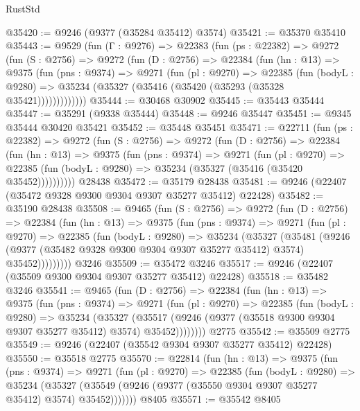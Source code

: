 \begin{lexlean}{RustStd}
\begin{coremodule}
@35420 := @9246 (@9377 (@35284 @35412) @3574)
@35421 := @35370 @35410
@35443 := @9529
    (fun (Γ : @9276) =>
    @22383
      (fun (ps : @22382) =>
      @9272
        (fun (S : @2756) =>
        @9272
          (fun (D : @2756) =>
          @22384
            (fun (hn : @13) =>
            @9375
              (fun (pns : @9374) =>
              @9271
                (fun (pl : @9270) =>
                @22385
                  (fun (bodyL : @9280) =>
                  @35234 (@35327 (@35416 (@35420 (@35293 (@35328 @35421)))))))))))))
@35444 := @30468 @30902
@35445 := @35443 @35444
@35447 := @35291 (@9338 @35444)
@35448 := @9246 @35447
@35451 := @9345 @35444 @30420 @35421
@35452 := @35448 @35451
@35471 := @22711
    (fun (ps : @22382) =>
    @9272
      (fun (S : @2756) =>
      @9272
        (fun (D : @2756) =>
        @22384
          (fun (hn : @13) =>
          @9375
            (fun (pns : @9374) =>
            @9271
              (fun (pl : @9270) =>
              @22385 (fun (bodyL : @9280) => @35234 (@35327 (@35416 (@35420 @35452))))))))))
    @28438
@35472 := @35179 @28438
@35481 := @9246 (@22407 (@35472 @9328 @9300 @9304 @9307 @35277 @35412) @22428)
@35482 := @35190 @28438
@35508 := @9465
    (fun (S : @2756) =>
    @9272
      (fun (D : @2756) =>
      @22384
        (fun (hn : @13) =>
        @9375
          (fun (pns : @9374) =>
          @9271
            (fun (pl : @9270) =>
            @22385
              (fun (bodyL : @9280) =>
              @35234
                (@35327
                  (@35481
                    (@9246
                      (@9377 (@35482 @9328 @9300 @9304 @9307 @35277 @35412) @3574)
                      @35452)))))))))
    @3246
@35509 := @35472 @3246
@35517 := @9246 (@22407 (@35509 @9300 @9304 @9307 @35277 @35412) @22428)
@35518 := @35482 @3246
@35541 := @9465
    (fun (D : @2756) =>
    @22384
      (fun (hn : @13) =>
      @9375
        (fun (pns : @9374) =>
        @9271
          (fun (pl : @9270) =>
          @22385
            (fun (bodyL : @9280) =>
            @35234
              (@35327
                (@35517 (@9246 (@9377 (@35518 @9300 @9304 @9307 @35277 @35412) @3574) @35452))))))))
    @2775
@35542 := @35509 @2775
@35549 := @9246 (@22407 (@35542 @9304 @9307 @35277 @35412) @22428)
@35550 := @35518 @2775
@35570 := @22814
    (fun (hn : @13) =>
    @9375
      (fun (pns : @9374) =>
      @9271
        (fun (pl : @9270) =>
        @22385
          (fun (bodyL : @9280) =>
          @35234
            (@35327 (@35549 (@9246 (@9377 (@35550 @9304 @9307 @35277 @35412) @3574) @35452)))))))
    @8405
@35571 := @35542 @8405

\end{coremodule}
\end{lexlean}
